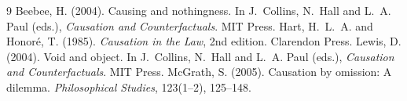\documentclass{situationist-preprint}
\begin{document}
\begin{thebibliography}{9}\small
{} Beebee, H. (2004). Causing and nothingness. In J.~Collins, N.~Hall and L.~A. Paul (eds.), \emph{Causation and Counterfactuals}. MIT Press.
 Hart, H.~L.~A. and Honor\'e, T. (1985). \emph{Causation in the Law}, 2nd edition. Clarendon Press.
 Lewis, D. (2004). Void and object. In J.~Collins, N.~Hall and L.~A. Paul (eds.), \emph{Causation and Counterfactuals}. MIT Press.
 McGrath, S. (2005). Causation by omission: A dilemma. \emph{Philosophical Studies}, 123(1--2), 125--148.
\end{thebibliography}
\end{document}
